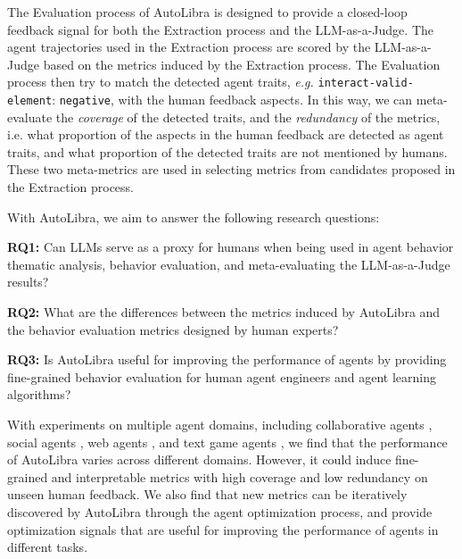 The Evaluation process of AutoLibra is designed to provide a closed-loop feedback signal for both the Extraction process
and the LLM-as-a-Judge. The agent trajectories used in the Extraction process are scored by the LLM-as-a-Judge based
on the metrics induced by the Extraction process. The Evaluation process then try to match the detected agent traits,
\emph{e.g.} \texttt{interact-valid-element}: \texttt{negative}, with the human feedback aspects.
In this way, we can meta-evaluate the \emph{coverage} of the detected traits, and the \emph{redundancy} of the metrics,
i.e. what proportion of the aspects in the human feedback are detected as agent traits,
and what proportion of the detected traits are not mentioned by humans. These two meta-metrics are used in selecting
metrics from candidates proposed in the Extraction process.



With AutoLibra, we aim to answer the following research questions:

\textbf{RQ1:} Can LLMs serve as a proxy for humans when being used in agent behavior thematic analysis,
    behavior evaluation, and meta-evaluating the LLM-as-a-Judge results?

\textbf{RQ2:}    What are the differences between the metrics induced by AutoLibra and the behavior evaluation
    metrics designed by human experts?

\textbf{RQ3:}  Is AutoLibra useful for improving the performance of agents by 
    providing fine-grained behavior evaluation for human agent engineers and agent learning algorithms?


With experiments on multiple agent domains, including collaborative agents \citep{shao2024collaborative}, social agents 
\citep{zhousotopia}, web agents \citep{zhouwebarena,he2024webvoyager}, and text game agents \citep{paglieri2024balrog,cloos2024babaaibreakrules}, 
we find that the performance of AutoLibra varies across different domains. 
However, it could induce fine-grained and interpretable metrics with high coverage and low redundancy on unseen human feedback.
We also find that new metrics can be iteratively discovered by AutoLibra through the agent optimization process,
and provide optimization signals that are useful for improving the performance of agents in different tasks.




